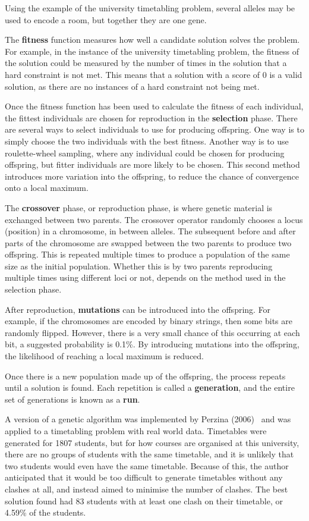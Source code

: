 Using the example of the university timetabling problem, several alleles may be
used to encode a room, but together they are one gene.

The \textbf{fitness} function measures how well a candidate solution solves the
problem.
For example, in the instance of the university timetabling problem, the fitness 
of the solution could be measured by the number of times in the solution that a
hard constraint is not met.
This means that a solution with a score of 0 is a valid solution, as there are
no instances of a hard constraint not being met.

Once the fitness function has been used to calculate the fitness of each
individual, the fittest individuals are chosen for reproduction in the
\textbf{selection} phase.
There are several ways to select individuals to use for producing offspring.
One way is to simply choose the two individuals with the best fitness.
Another way is to use roulette-wheel sampling, where any individual could be
chosen for producing offspring, but fitter individuals are more likely to be
chosen.
This second method introduces more variation into the offspring, to reduce the
chance of convergence onto a local maximum.

The \textbf{crossover} phase, or reproduction phase, is where genetic material
is exchanged between two parents.
The crossover operator randomly chooses a locus (position) in a chromosome,
in between alleles.
The subsequent before and after parts of the chromosome are swapped between the
two parents to produce two offspring.
This is repeated multiple times to produce a population of the same size as the
initial population.
Whether this is by two parents reproducing multiple times using different loci
or not, depends on the method used in the selection phase.

After reproduction, \textbf{mutations} can be introduced into the offspring. 
For example, if the chromosomes are encoded by binary strings, then some bits 
are randomly flipped.
However, there is a very small chance of this occurring at each bit, a suggested
probability is 0.1\%.
By introducing mutations into the offspring, the likelihood of reaching a local
maximum is reduced.

Once there is a new population made up of the offspring, the process repeats 
until a solution is found.
Each repetition is called a \textbf{generation}, and the entire set of
generations is known as a \textbf{run}.

A version of a genetic algorithm was implemented by Perzina 
(2006)~\cite{ga_example} and was applied to a timetabling problem with real 
world data.
Timetables were generated for 1807 students, but for how courses are organised 
at this university, there are no groups of students with the same timetable, and
it is unlikely that two students would even have the same timetable.
Because of this, the author anticipated that it would be too difficult to
generate timetables without any clashes at all, and instead aimed to minimise
the number of clashes.
The best solution found had 83 students with at least one clash on their
timetable, or 4.59\% of the students.

